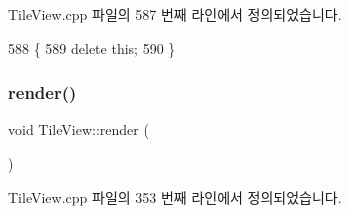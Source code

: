Tile\+View.\+cpp 파일의 587 번째 라인에서 정의되었습니다.


\begin{DoxyCode}
588 \{
589   \textcolor{keyword}{delete} \textcolor{keyword}{this};
590 \}
\end{DoxyCode}
\mbox{\label{class_tile_view_a4b8f6e14f8ee7d4abea3a751cb5f7d74}} 
\subsubsection{\texorpdfstring{render()}{render()}}
{\footnotesize\ttfamily void Tile\+View\+::render (\begin{DoxyParamCaption}{ }\end{DoxyParamCaption})}



Tile\+View.\+cpp 파일의 353 번째 라인에서 정의되었습니다.


